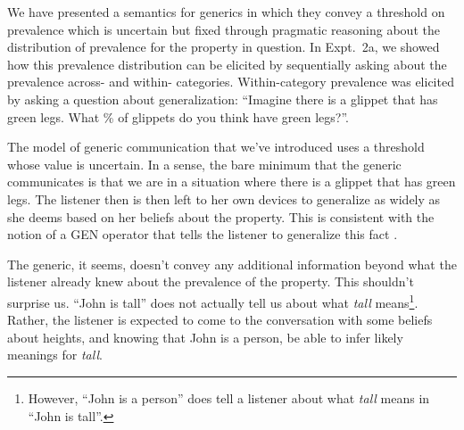 \documentclass[10pt,letterpaper]{article}
\begin{document}
We have presented a semantics for generics in which they convey a threshold on prevalence which is uncertain but fixed through pragmatic reasoning about the distribution of prevalence for the property in question.
In Expt.~2a, we showed how this prevalence distribution can be elicited by sequentially asking about the prevalence across- and within- categories. 
Within-category prevalence was elicited by asking a question about generalization: ``Imagine there is a glippet that has green legs. What \% of glippets do you think have green legs?''.

The model of generic communication that we've introduced uses a threshold whose value is uncertain. 
In a sense, the bare minimum that the generic communicates is that we are in a situation where there is a glippet that has green legs. 
The listener then is then left to her own devices to generalize as widely as she deems based on her beliefs about the property. 
This is consistent with the notion of a GEN operator that tells the listener to generalize this fact \cite{Leslie2008}.


The generic, it seems, doesn't convey any additional information beyond what the listener already knew about the prevalence of the property.
This shouldn't surprise us. ``John is tall'' does not actually tell us about what \emph{tall} means\footnote{However, ``John is a person'' does tell a listener about what \emph{tall} means in ``John is tall''.}. 
Rather, the listener is expected to come to the conversation with some beliefs about heights, and knowing that John is a person, be able to infer likely meanings for \emph{tall}.






%
%


\end{document}
